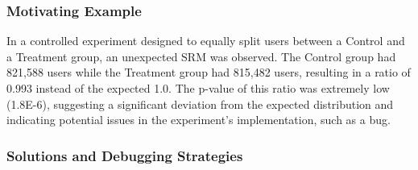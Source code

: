 \documentclass{article}
\begin{document}
\subsubsection*{Motivating Example}
In a controlled experiment designed to equally split users between a Control and a Treatment group, an unexpected SRM was observed. The Control group had 821,588 users while the Treatment group had 815,482 users, resulting in a ratio of 0.993 instead of the expected 1.0. The p-value of this ratio was extremely low (1.8E-6), suggesting a significant deviation from the expected distribution and indicating potential issues in the experiment's implementation, such as a bug.

\subsubsection*{Solutions and Debugging Strategies}
\end{document}
